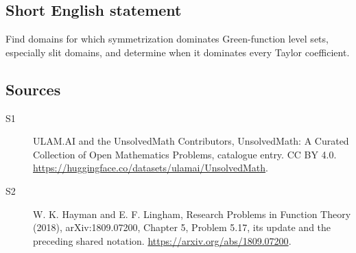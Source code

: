 \documentclass[11pt]{article}
\begin{document}
\subsection{Short English statement}
Find domains for which symmetrization dominates Green-function level sets, especially slit domains, and determine when it dominates every Taylor coefficient.
\subsection{Sources}
\begin{description}
\item[\hypertarget{source:statement:1}{S1}] ULAM.AI and the UnsolvedMath Contributors, UnsolvedMath: A Curated Collection of Open Mathematics Problems, catalogue entry. CC BY 4.0. \url{https://huggingface.co/datasets/ulamai/UnsolvedMath}.
\item[\hypertarget{source:statement:2}{S2}] W. K. Hayman and E. F. Lingham, Research Problems in Function Theory (2018), arXiv:1809.07200, Chapter 5, Problem 5.17, its update and the preceding shared notation. \url{https://arxiv.org/abs/1809.07200}.
\end{description}
\label{end:statement}
\end{document}
